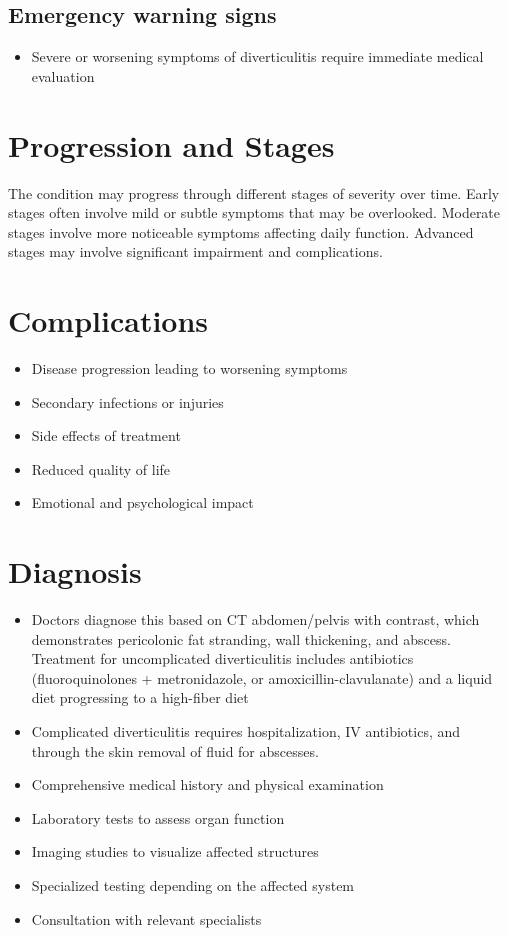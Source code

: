 \subsection{Emergency warning signs}
\begin{itemize}[noitemsep]
  \item Severe or worsening symptoms of diverticulitis require immediate medical evaluation
\end{itemize}
\section{Progression and Stages}
The condition may progress through different stages of severity over time. Early stages often involve mild or subtle symptoms that may be overlooked. Moderate stages involve more noticeable symptoms affecting daily function. Advanced stages may involve significant impairment and complications.
\section{Complications}
\begin{itemize}[noitemsep]
  \item Disease progression leading to worsening symptoms
  \item Secondary infections or injuries
  \item Side effects of treatment
  \item Reduced quality of life
  \item Emotional and psychological impact
\end{itemize}
\section{Diagnosis}
\begin{itemize}[noitemsep]
  \item Doctors diagnose this based on CT abdomen/pelvis with contrast, which demonstrates pericolonic fat stranding, wall thickening, and abscess. Treatment for uncomplicated diverticulitis includes antibiotics (fluoroquinolones + metronidazole, or amoxicillin-clavulanate) and a liquid diet progressing to a high-fiber diet
  \item Complicated diverticulitis requires hospitalization, IV antibiotics, and through the skin removal of fluid for abscesses.
  \item Comprehensive medical history and physical examination
  \item Laboratory tests to assess organ function
  \item Imaging studies to visualize affected structures
  \item Specialized testing depending on the affected system
  \item Consultation with relevant specialists
\end{itemize}
